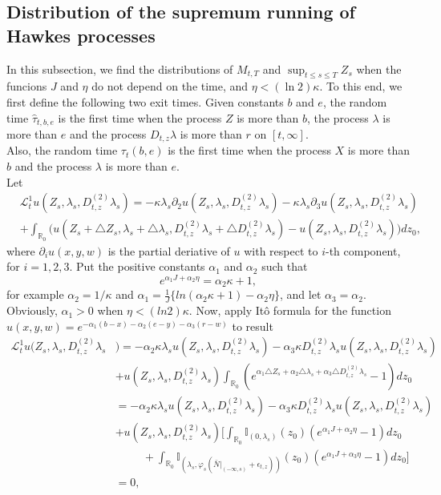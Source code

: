 \documentclass[11pt]{article}
\numberwithin{equation}{section}
\begin{document}
\subsection{Distribution of the supremum running of Hawkes processes}
In this subsection, we find the distributions of $M_{t,T}$ and $\sup_{t \leq s \leq T}Z_s$ when the funcions $J$ and $\eta$ do not depend on the time, and $\eta < (\ln2)\kappa$. To this end, we first define the following two exit times.
Given constants $b$ and $e$, the random time $\hat{\tau}_{t,b,e}$ is the first time when the process $Z$ is more than $b$, the process $\lambda$ is more than $e$ and the process $D_{t,z}\lambda$ is more than $r$  on $[t,\infty]$.\\
Also, the random time ${\tau}_{t}(b,e)$ is the first time when the process $X$ is more than $b$ and the process $\lambda$ is more than $e$.\\
Let 
\begin{align*}
&\mathcal{L}_t^1 u(Z_s, \lambda_s, D_{t,z}^{(2)}\lambda_s)=-\kappa \lambda_s \partial_2 u(Z_s,\lambda_s, D_{t,z}^{(2)}\lambda_s) - \kappa \lambda_s \partial_3 u(Z_s,\lambda_s, D_{t,z}^{(2)}\lambda_s) \\
&+ \int_{\mathbb{R}_0}\Big(u(Z_s+\triangle Z_s, \lambda_s+\triangle \lambda_s, D_{t,z}^{(2)}\lambda_s+\triangle D_{t,z}^{(2)}\lambda_s)-u(Z_s,\lambda_s, D_{t,z}^{(2)}\lambda_s)\Big) dz_0,
\end{align*}
where $\partial_i u(x,y,w)$ is the partial deriative of $u$ with respect to $i$-th component, for $i=1,2,3$.
Put the positive constants $\alpha_1$ and $\alpha_2$ such that $$e^{\alpha_1 J + \alpha_2 \eta} = \alpha_2 \kappa +1,$$ for example $\alpha_2=1/\kappa$ and $\alpha_1= \frac{1}{J}\{ln(\alpha_2 \kappa +1)-\alpha_2 \eta\}$, and let $\alpha_3=\alpha_2$. Obviously, $\alpha_1 > 0$ when $\eta < (ln2)\kappa$.
Now, apply It\^o formula for the function $u(x,y,w)=e^{-\alpha_1(b-x)-\alpha_2(e-y)-\alpha_3(r-w)}$ to result 
\begin{align*}
\mathcal{L}_t^1u(Z_s, \lambda_s, D_{t,z}^{(2)}\lambda_s&)=-\alpha_2 \kappa \lambda_s u(Z_s,\lambda_s, D_{t,z}^{(2)}\lambda_s)-\alpha_3 \kappa D_{t,z}^{(2)}\lambda_s u(Z_s,\lambda_s, D_{t,z}^{(2)}\lambda_s)\\
&+u(Z_s,\lambda_s, D_{t,z}^{(2)}\lambda_s)\int_{\mathbb{R}_0} (e^{\alpha_1 \triangle Z_s+ \alpha_2 \triangle \lambda_s+ \alpha_3 \triangle D_{t,z}^{(2)}\lambda_s  }- 1)dz_0\\
&=-\alpha_2 \kappa \lambda_s u(Z_s,\lambda_s, D_{t,z}^{(2)}\lambda_s)-\alpha_3 \kappa D_{t,z}^{(2)}\lambda_s u(Z_s,\lambda_s, D_{t,z}^{(2)}\lambda_s)\\
&+ u(Z_s,\lambda_s, D_{t,z}^{(2)}\lambda_s)\Big[\int_{\mathbb{R}_0} \mathbb{I}_{(0,\lambda_s)}(z_0)(e^{\alpha_1 J+ \alpha_2 \eta }- 1)dz_0\\
& \        \     \qquad  +\int_{\mathbb{R}_0} \mathbb{I}_{(\lambda_s, \varphi_s(\bar{N}|_{(-\infty, s)}+\epsilon_{t,z}))}(z_0)(e^{\alpha_1 J+\alpha_3 \eta}- 1)dz_0\Big]\\
&= 0,
\end{align*}
\end{document}
